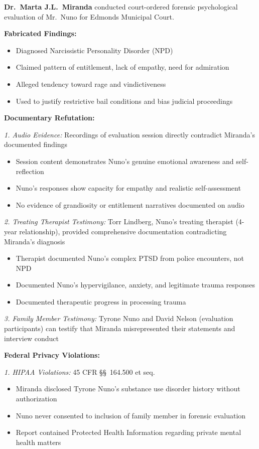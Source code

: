 \documentclass[11pt, letterpaper]{article}
\begin{document}
\textbf{Dr.\ Marta J.L.\ Miranda} conducted court-ordered forensic psychological evaluation of Mr.\ Nuno for Edmonds Municipal Court.

\textbf{Fabricated Findings:}
\begin{itemize}[leftmargin=*,itemsep=2pt]
    \item Diagnosed Narcissistic Personality Disorder (NPD)
    \item Claimed pattern of entitlement, lack of empathy, need for admiration
    \item Alleged tendency toward rage and vindictiveness
    \item Used to justify restrictive bail conditions and bias judicial proceedings
\end{itemize}

\textbf{Documentary Refutation:}

\textit{1. Audio Evidence:} Recordings of evaluation session directly contradict Miranda's documented findings
\begin{itemize}[leftmargin=*,itemsep=2pt]
    \item Session content demonstrates Nuno's genuine emotional awareness and self-reflection
    \item Nuno's responses show capacity for empathy and realistic self-assessment
    \item No evidence of grandiosity or entitlement narratives documented on audio
\end{itemize}

\textit{2. Treating Therapist Testimony:} Torr Lindberg, Nuno's treating therapist (4-year relationship), provided comprehensive documentation contradicting Miranda's diagnosis
\begin{itemize}[leftmargin=*,itemsep=2pt]
    \item Therapist documented Nuno's complex PTSD from police encounters, not NPD
    \item Documented Nuno's hypervigilance, anxiety, and legitimate trauma responses
    \item Documented therapeutic progress in processing trauma
\end{itemize}

\textit{3. Family Member Testimony:} Tyrone Nuno and David Nelson (evaluation participants) can testify that Miranda misrepresented their statements and interview conduct

\textbf{Federal Privacy Violations:}

\textit{1. HIPAA Violations:} 45 CFR \S\S\ 164.500 et seq.
\begin{itemize}[leftmargin=*,itemsep=2pt]
    \item Miranda disclosed Tyrone Nuno's substance use disorder history without authorization
    \item Nuno never consented to inclusion of family member in forensic evaluation
    \item Report contained Protected Health Information regarding private mental health matters
\end{itemize}
\end{document}
